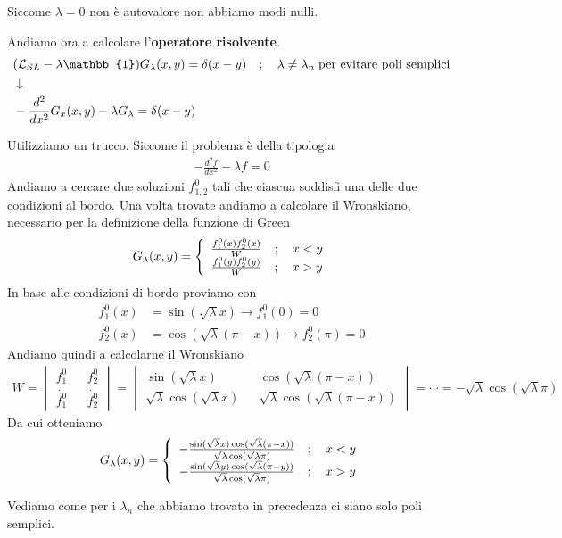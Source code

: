 Siccome $\lambda=0$ non è autovalore non abbiamo modi nulli.

Andiamo ora a calcolare l'\textbf{operatore risolvente}.
\begin{align}
	&(\mathcal{L}_{SL} -\lambda \mathbb{1}) G_\lambda (x,y) = \delta (x-y) \spacer \lambda \neq \lambda_n \; \text{per evitare poli semplici} \firstpassage
	&-\frac{d^2}{dx^2} G_x(x,y) - \lambda G_\lambda = \delta (x-y)
\end{align}

Utilizziamo un trucco. Siccome il problema è della tipologia
\begin{align}
	-\frac{d^2f}{dx^2} - \lambda f = 0
\end{align}
Andiamo a cercare due soluzioni $f^0_{1,2}$ tali che ciascua soddisfi una delle due condizioni al bordo. Una volta trovate andiamo a calcolare il Wronskiano, necessario per la definizione della funzione di Green
\begin{align}
	G_\lambda (x,y) = \left\{ \begin{array}{cc} \frac{f_1^0(x)f_2^0(x)}{W} \quad ; \quad x<y\\ \frac{f_1^0(y)f_2^0(y)}{W} \quad ; \quad x>y \end{array} \right.
\end{align}
In base alle condizioni di bordo proviamo con
\begin{align}
	f_1^0(x) &= \sin(\sqrt{\lambda} x) \to f_1^0(0) =0\\
	f_2^0(x) &= \cos(\sqrt{\lambda} (\pi-x)) \to f_2^0(\pi) =0
\end{align}
Andiamo quindi a calcolarne il Wronskiano
\begin{align}
	W = \begin{vmatrix}
		f_1^0 && f_2^0\\
		\dot{f_1^0} && \dot{f_2^0}
	\end{vmatrix} = \begin{vmatrix}
	\sin(\sqrt{\lambda} x) && \cos(\sqrt{\lambda} (\pi-x))\\
	\sqrt{\lambda}\cos(\sqrt{\lambda}x) && \sqrt{\lambda} \cos (\sqrt{\lambda} (\pi-x))
\end{vmatrix} = \cdots = -\sqrt{\lambda} \cos( \sqrt{\lambda} \pi)
\end{align}
Da cui otteniamo
\begin{align}
	G_\lambda (x,y) = \left\{ \begin{array}{cc} -\frac{ \sin(\sqrt{\lambda} x)\cos(\sqrt{\lambda} (\pi-x))}{\sqrt{\lambda} \cos( \sqrt{\lambda} \pi)} \quad ; \quad x<y\\ -\frac{ \sin(\sqrt{\lambda} y)\cos(\sqrt{\lambda} (\pi-y))}{\sqrt{\lambda} \cos( \sqrt{\lambda} \pi)} \quad ; \quad x>y \end{array} \right.
\end{align}

Vediamo come per i $\lambda_n$ che abbiamo trovato in precedenza ci siano solo poli semplici.

